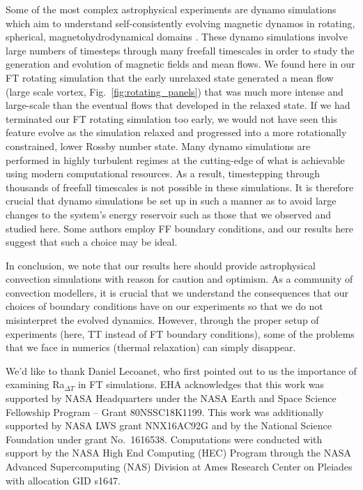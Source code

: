 \documentclass[aps, pre, onecolumn, nofootinbib, notitlepage, groupedaddress, amsfonts, amssymb, amsmath, longbibliography, superscriptaddress]{revtex4-1}
\begin{document}
Some of the most complex astrophysical experiments are dynamo simulations which aim to understand self-consistently evolving magnetic dynamos in rotating, spherical, magnetohydrodynamical domains \cite{brown&all2010, yadav&all2016, strugarek&all2017, strugarek&all2018}.
These dynamo simulations involve large numbers of timesteps through many freefall timescales in order to study the generation and evolution of magnetic fields and mean flows.
We found here in our FT rotating simulation that the early unrelaxed state generated a mean flow (large scale vortex, Fig.~\ref{fig:rotating_panels}) that was much more intense and large-scale than the eventual flows that developed in the relaxed state.
If we had terminated our FT rotating simulation too early, we would not have seen this feature evolve as the simulation relaxed and progressed into a more rotationally constrained, lower Rossby number state.
Many dynamo simulations are performed in highly turbulent regimes at the cutting-edge of what is achievable using modern computational resources.
As a result, timestepping through thousands of freefall timescales is not possible in these simulations.
It is therefore crucial that dynamo simulations be set up in such a manner as to avoid large changes to the system's energy reservoir such as those that we observed and studied here.
Some authors \citep{featherstone&hindman2016a, strugarek&all2018, bordwell&all2018, matilsky&all2019} employ FF boundary conditions, and our results here suggest that such a choice may be ideal.

In conclusion, we note that our results here should provide astrophysical convection simulations with reason for caution and optimism.
As a community of convection modellers, it is crucial that we understand the consequences that our choices of boundary conditions have on our experiments so that we do not misinterpret the evolved dynamics.
However, through the proper setup of experiments (here, TT instead of FT boundary conditions), some of the problems that we face in numerics (thermal relaxation) can simply disappear.

\begin{acknowledgments}
We'd like to thank Daniel Lecoanet, who first pointed out to us the importance of examining Ra$_{\Delta T}$ in FT simulations. 
EHA acknowledges that this work was supported by NASA Headquarters under the NASA Earth and Space Science Fellowship Program -- Grant 80NSSC18K1199.
This work was additionally supported by NASA LWS grant NNX16AC92G and by the National Science Foundation under grant No.~1616538. 
Computations were conducted with support by the NASA High End Computing (HEC) Program through the NASA  Advanced Supercomputing (NAS) Division at Ames Research Center on Pleiades with allocation GID s1647.
\end{acknowledgments}
\end{document}
